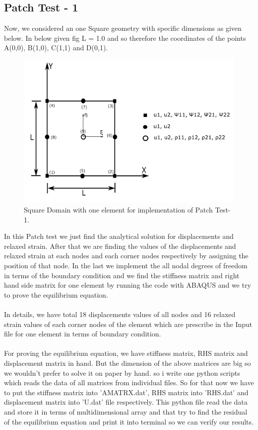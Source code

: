 \documentclass[12pt]{article}
\begin{document}
\subsection{Patch Test - 1}
Now, we considered an one Square geometry with specific dimensions as given below. In below given fig L = 1.0 and so therefore the coordinates of the points A(0,0), B(1,0), C(1,1) and D(0,1).  
\begin{figure}[H]
	\begin{center}
		\includegraphics[scale=0.8]{ele_1.png} 
	\end{center}  
   \caption{Square Domain with one element for implementation of Patch Test-1.}
\end{figure} 
In this Patch test we just find the analytical solution for displacements and relaxed strain.
After that we are finding the values of the displacements and relaxed strain at each nodes and each corner nodes respectively by assigning the position of that node. In the last we implement the all nodal degrees of freedom in terms of the boundary condition and we find the stiffness matrix and right hand side matrix for one element by running the code with ABAQUS and we try to prove the equilibrium equation.
\\
\\
In details, we have total 18 displacements values of all nodes and 16 relaxed strain values of each corner nodes of the element which are prescribe in the Input file for one element in terms of boundary condition.  
\\ 
\\
For proving the equilibrium equation, we have stiffness matrix, RHS matrix and displacement matrix in hand. But the dimension of the above matrices are big so we wouldn't prefer to solve it on paper by hand. so i write one python scripts which reads the data of all matrices from individual files. So for that now we have to put the stiffness matrix into 'AMATRX.dat', RHS matrix into 'RHS.dat' and displacement matrix into 'U.dat' file respectively. This python file read the data and store it in terms of multidimensional array and that try to find the residual of the equilibrium equation and print it into terminal so we can verify our results.
\end{document}
